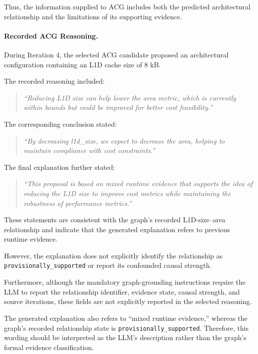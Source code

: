Thus, the information supplied to ACG
includes both the predicted architectural
relationship and the limitations of
its supporting evidence.


\paragraph{Recorded ACG Reasoning.}

During Iteration 4, the selected ACG
candidate proposed an architectural
configuration containing an L1D cache
size of 8 kB.

The recorded reasoning included:

\begin{quote}
\emph{``Reducing L1D size can help lower
the area metric, which is currently
within bounds but could be improved
for better cost feasibility.''}
\end{quote}

The corresponding conclusion stated:

\begin{quote}
\emph{``By decreasing l1d\_size, we expect
to decrease the area, helping to
maintain compliance with cost constraints.''}
\end{quote}

The final explanation further stated:

\begin{quote}
\emph{``This proposal is based on mixed
runtime evidence that supports the idea
of reducing the L1D size to improve cost
metrics while maintaining the robustness
of performance metrics.''}
\end{quote}

These statements are consistent with
the graph's recorded L1D-size--area
relationship and indicate that the
generated explanation refers to
previous runtime evidence.

However, the explanation does not
explicitly identify the relationship
as \texttt{provisionally\_supported}
or report its confounded causal strength.

Furthermore, although the mandatory
graph-grounding instructions require
the LLM to report the relationship
identifier, evidence state, causal
strength, and source iterations,
these fields are not explicitly
reported in the selected reasoning.

The generated explanation also refers
to ``mixed runtime evidence,''
whereas the graph's recorded
relationship state is
\texttt{provisionally\_supported}.
Therefore, this wording should be
interpreted as the LLM's description
rather than the graph's formal
evidence classification.


